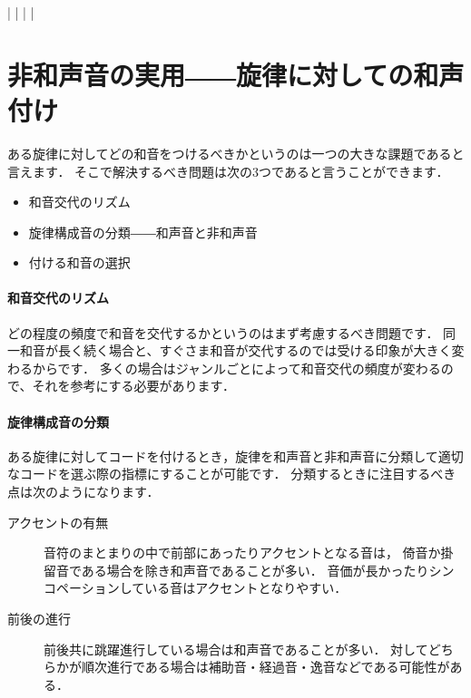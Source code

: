 \documentclass[dvipdfmx,uplatex,b5paper,openany,jbase=12Q,nomag*,textwidth-limit=44%
               ]{gachimuchi}[2020/05/05]
\begin{document}
\begin{Music}[.6\linewidth]
  \generalmeter{\meterC}%
  \Startpiece%
  \NOtes%
  |%
  \en\NOTes%
  |%
  \en\doublebar%
  \NOtes%
  |%
  \en\NOTes%
  |%
  \en\setdoublebar%
  \endpiece%
\end{Music}

\section{非和声音の実用――旋律に対しての和声付け}
ある旋律に対してどの和音をつけるべきかというのは一つの大きな課題であると言えます．
そこで解決するべき問題は次の3つであると言うことができます．
\begin{itemize}
  \item 和音交代のリズム
  \item 旋律構成音の分類――和声音と非和声音
  \item 付ける和音の選択
\end{itemize}

\paragraph{和音交代のリズム}
どの程度の頻度で和音を交代するかというのはまず考慮するべき問題です．
同一和音が長く続く場合と、すぐさま和音が交代するのでは受ける印象が大きく変わるからです．
多くの場合はジャンルごとによって和音交代の頻度が変わるので、それを参考にする必要があります．

\begin{comment}
\subparagraph{コラール}
コラールにおいては，基本のリズムを4分音符とすれば，ほとんど4分音符ごとに和音が変わることが多いです．
テンポ自体は速くないので，急速な和音変化とは感じられないかもしれません．
\subparagraph{}
\end{comment}
\paragraph{旋律構成音の分類}
ある旋律に対してコードを付けるとき，旋律を和声音と非和声音に分類して適切なコードを選ぶ際の指標にすることが可能です．
分類するときに注目するべき点は次のようになります．
\begin{description}
  \item[アクセントの有無]
    音符のまとまりの中で前部にあったりアクセントとなる音は，
    倚音か掛留音である場合を除き和声音であることが多い．
    音価が長かったりシンコペーションしている音はアクセントとなりやすい．
  \item[前後の進行]
    前後共に跳躍進行している場合は和声音であることが多い．
    対してどちらかが順次進行である場合は補助音・経過音・逸音などである可能性がある．
\end{description}
\end{document}
